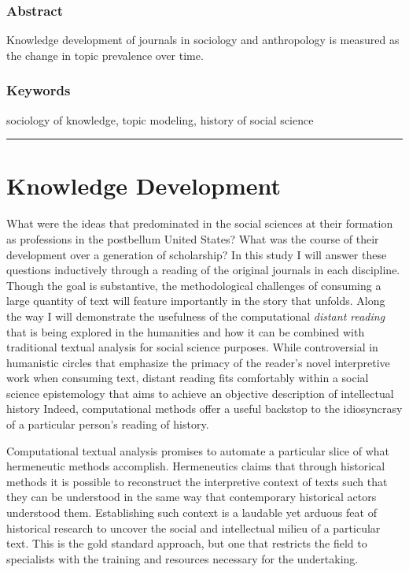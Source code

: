 \documentclass[]{book}
\theoremstyle{definition}
\theoremstyle{definition}
\theoremstyle{definition}
\theoremstyle{remark}
\begin{document}
\hypertarget{abstract-3}{%
\subsubsection*{Abstract}\label{abstract-3}}


Knowledge development of journals in sociology and
anthropology is measured as the change in topic prevalence over time.

\hypertarget{keywords-3}{%
\subsubsection*{Keywords}\label{keywords-3}}


sociology of knowledge, topic modeling, history of social
science

\begin{center}\rule{0.5\linewidth}{\linethickness}\end{center}

\hypertarget{kd}{%
\section{Knowledge Development}\label{kd}}

What were the ideas that predominated in the social sciences at their
formation as professions in the postbellum United States? What was the
course of their development over a generation of scholarship? In this
study I will answer these questions inductively through a reading of the
original journals in each discipline. Though the goal is substantive,
the methodological challenges of consuming a large quantity of text will
feature importantly in the story that unfolds. Along the way I will
demonstrate the usefulness of the computational \emph{distant reading}
that is being explored in the humanities and how it can be combined with
traditional textual analysis for social science purposes. While
controversial in humanistic circles that emphasize the primacy of the
reader's novel interpretive work when consuming text, distant reading
fits comfortably within a social science epistemology that aims to
achieve an objective description of intellectual history Indeed,
computational methods offer a useful backstop to the idiosyncrasy of a
particular person's reading of history.

Computational textual analysis promises to automate a particular slice
of what hermeneutic methods accomplish. Hermeneutics claims that through
historical methods it is possible to reconstruct the interpretive
context of texts such that they can be understood in the same way that
contemporary historical actors understood them. Establishing such
context is a laudable yet arduous feat of historical research to uncover
the social and intellectual milieu of a particular text. This is the
gold standard approach, but one that restricts the field to specialists
with the training and resources necessary for the undertaking.
\end{document}
